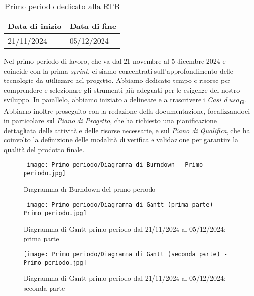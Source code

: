 \begin{table}[h!]
    \centering
    \renewcommand{\arraystretch}{1.5} %
    \begin{tabularx}{\textwidth}{|X|X|}\hline
    \rowcolor[HTML]{FFD700} 
    \textbf{Data di inizio} & \textbf{Data di fine} \\ \hline
    21/11/2024 & 05/12/2024 \\ \hline
    \end{tabularx}
    \caption{Primo periodo dedicato alla RTB}
\end{table}
Nel primo periodo di lavoro, che va dal 21 novembre al 5 dicembre 2024 e coincide con la prima \textit{sprint}, 
ci siamo concentrati sull'approfondimento delle tecnologie da utilizzare nel progetto. 
Abbiamo dedicato tempo e risorse per comprendere e selezionare gli strumenti più adeguati per le esigenze del nostro sviluppo. In parallelo, abbiamo iniziato a delineare e a trascrivere i \textit{Casi d'uso}\textsubscript{\textit{\textbf{G}}}.
Abbiamo inoltre proseguito con la redazione della documentazione, focalizzandoci in particolare sul \textit{Piano di Progetto}, che ha richiesto una pianificazione dettagliata delle attività e delle risorse necessarie, e sul \textit{Piano di Qualifica}, che ha coinvolto la definizione delle modalità di verifica e validazione per garantire la qualità del prodotto finale.
\newpage
\begin{figure}[h] 
    \centering
    \texttt{[image: Primo periodo/Diagramma di Burndown - Primo periodo.jpg]}
    \caption{Diagramma di Burndown del primo periodo} 
    \label{fig: Diagramma di Burndown del primo periodo}
\end{figure}
\newpage
\begin{figure}[h] 
    \centering
    \texttt{[image: Primo periodo/Diagramma di Gantt (prima parte) - Primo periodo.jpg]}
    \caption{Diagramma di Gantt primo periodo dal 21/11/2024 al 05/12/2024: prima parte} 
    \label{fig: Diagramma di Gantt primo periodo dal 21/11/2024 al 05/12/2024: prima parte}
\end{figure}
\newpage


\begin{figure}[h] 
    \centering
    \texttt{[image: Primo periodo/Diagramma di Gantt (seconda parte) - Primo periodo.jpg]}
    \caption{Diagramma di Gantt primo periodo dal 21/11/2024 al 05/12/2024: seconda parte} 
    \label{fig: Diagramma di Gantt primo periodo dal 21/11/2024 al 05/12/2024: seconda parte}
\end{figure}

